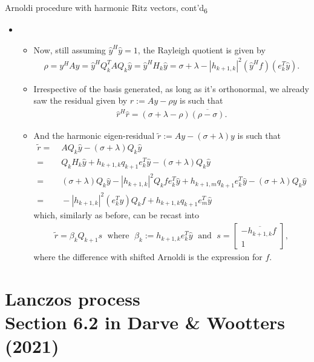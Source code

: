 \documentclass[t,usepdftitle=false]{beamer}
\begin{document}
\begin{frame}{Arnoldi procedure with harmonic Ritz vectors, cont'd\textsubscript{6}}
\begin{itemize}
\item[]
\begin{itemize}\normalsize
\item Now, still assuming $\hat{y}^H\hat{y}=1$, the Rayleigh quotient is given by
\begin{align*}
\rho=y^HAy=\hat{y}^HQ_k^TAQ_k\hat{y}=\hat{y}^HH_k\hat{y}=\sigma+\lambda-|h_{k+1,k}|^2(\hat{y}^Hf)(e_k^T\hat{y}).
\end{align*}
\item Irrespective of the basis generated, as long as it's orthonormal, we already saw the residual given by $\hat{r}:=Ay-\rho y$ is such that
\begin{align*}
\hat{r}^H\hat{r}=(\sigma+\lambda-\rho)\overline{(\rho-\sigma)}.
\end{align*}
\item And the harmonic eigen-residual $\tilde{r}:=Ay-(\sigma+\lambda)y$ is such that\vspace{-.15cm}
\begin{align*}
\tilde{r}
=&\;AQ_k\hat{y}-(\sigma+\lambda)Q_k\hat{y}\\
=&\;Q_kH_k\hat{y}+h_{k+1,k}q_{k+1}e_k^T\hat{y}-(\sigma+\lambda)Q_k\hat{y}\\
=&\;(\sigma+\lambda)Q_k\hat{y}-|h_{k+1,k}|^2Q_kfe_k^T\hat{y}+h_{k+1,m}q_{k+1}e_k^T\hat{y}-(\sigma+\lambda)Q_k\hat{y}\\
=&\;-|h_{k+1,k}|^2(e_k^T\hat{y})Q_kf+h_{k+1,k}q_{k+1}e_m^T\hat{y}
\end{align*}
which, similarly as before, can be recast into\vspace{-.2cm}
\begin{align*}
\tilde{r}=\beta_kQ_{k+1}s
\;\text{ where }\;
\beta_k:=h_{k+1,k}e_k^T\hat{y}
\;\text{ and }\;
s=\begin{bmatrix}-\overline{h_{k+1,k}}f\\1\end{bmatrix},
\end{align*}
where the difference with shifted Arnoldi is the expression for $f$.
\end{itemize}
\end{itemize}
\end{frame}	
		
\section{Lanczos process\\{\small Section 6.2 in Darve \& Wootters (2021)}}
\end{document}
